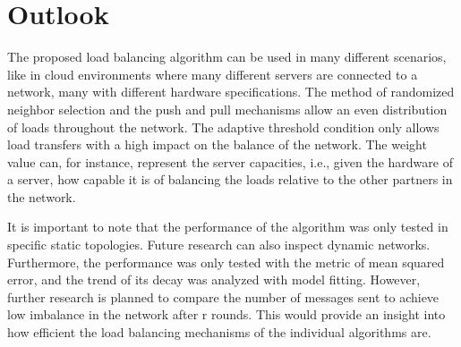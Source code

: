 \chapter{Outlook}\label{chap:outlook}
The proposed load balancing algorithm can be used in many different scenarios, like in cloud environments where many different servers are connected to a network, many with different hardware specifications. The method of randomized neighbor selection and the push and pull mechanisms allow an even distribution of loads throughout the network. The adaptive threshold condition only allows load transfers with a high impact on the balance of the network. The weight value can, for instance, represent the server capacities, i.e., given the hardware of a server, how capable it is of balancing the loads relative to the other partners in the network.

It is important to note that the performance of the algorithm was only tested in specific static topologies. Future research can also inspect dynamic networks. Furthermore, the performance was only tested with the metric of mean squared error, and the trend of its decay was analyzed with model fitting. However, further research is planned to compare the number of messages sent to achieve low imbalance in the network after r rounds. This would provide an insight into how efficient the load balancing mechanisms of the individual algorithms are.